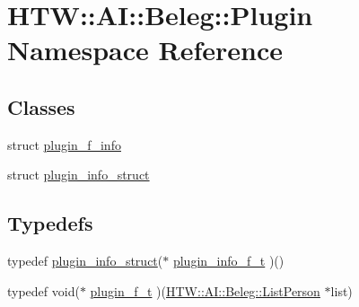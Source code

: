 \hypertarget{namespace_h_t_w_1_1_a_i_1_1_beleg_1_1_plugin}{\section{H\-T\-W\-:\-:A\-I\-:\-:Beleg\-:\-:Plugin Namespace Reference}
\label{namespace_h_t_w_1_1_a_i_1_1_beleg_1_1_plugin}
}
\subsection*{Classes}
\begin{DoxyCompactItemize}
\item 
struct \hyperlink{struct_h_t_w_1_1_a_i_1_1_beleg_1_1_plugin_1_1plugin__f__info}{plugin\-\_\-f\-\_\-info}
\item 
struct \hyperlink{struct_h_t_w_1_1_a_i_1_1_beleg_1_1_plugin_1_1plugin__info__struct}{plugin\-\_\-info\-\_\-struct}
\end{DoxyCompactItemize}
\subsection*{Typedefs}
\begin{DoxyCompactItemize}
\item 
typedef \hyperlink{struct_h_t_w_1_1_a_i_1_1_beleg_1_1_plugin_1_1plugin__info__struct}{plugin\-\_\-info\-\_\-struct}($\ast$ \hyperlink{namespace_h_t_w_1_1_a_i_1_1_beleg_1_1_plugin_a2d6055f756d6fbaacb016a64b2632b6a}{plugin\-\_\-info\-\_\-f\-\_\-t} )()
\item 
typedef void($\ast$ \hyperlink{namespace_h_t_w_1_1_a_i_1_1_beleg_1_1_plugin_ac175157f4a126a99ff03cec00c4dd9ec}{plugin\-\_\-f\-\_\-t} )(\hyperlink{struct_h_t_w_1_1_a_i_1_1_beleg_1_1_list_person}{H\-T\-W\-::\-A\-I\-::\-Beleg\-::\-List\-Person} $\ast$list)
\end{DoxyCompactItemize}
